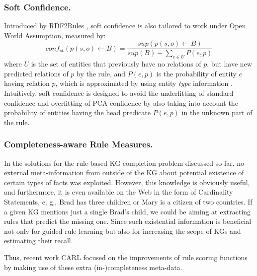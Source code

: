 \subsubsection{Soft Confidence.} Introduced by RDF2Rules \cite{rdf2rules}, soft confidence is also tailored to work under Open World Assumption, measured by:
\[conf_{st}(p(s,o) \leftarrow B) = \frac{sup(p(s,o) \leftarrow B)}{sup(B) - \sum_{e \in U}P(e,p)} \]
where $U$ is the set of entities that previously have no relations of $p$, but have new predicted relations of $p$ by the rule, and $P(e,p)$ is the probability of entity $e$ having relation $p$, which is approximated by using entity \textit{type} information \cite{rdf2rules}. Intuitively, soft confidence is designed to avoid the underfitting of standard confidence and overfitting of PCA confidence by also taking into account the probability of entities having the head predicate $P(e,p)$ in the unknown part of the rule.
\subsubsection{Completeness-aware Rule Measures.}  
In the solutions for the rule-based KG completion problem discussed so far, no external meta-information from outside of the KG about potential existence of certain types of facts was exploited. However, this knowledge is obviously useful, and furthermore, it is even available on the Web
in the form of Cardinality Statements, e. g., Brad has three children or Mary is a citizen of two countries. If a given KG mentions just a single Brad’s child, we could be aiming at extracting rules that predict the missing
one. Since such existential information is beneficial not only for guided rule learning but also for increasing the scope of KGs and estimating their recall.

Thus, recent work CARL \cite{carl} focused on the improvements of rule scoring functions by making use of these extra (in-)completeness meta-data.

